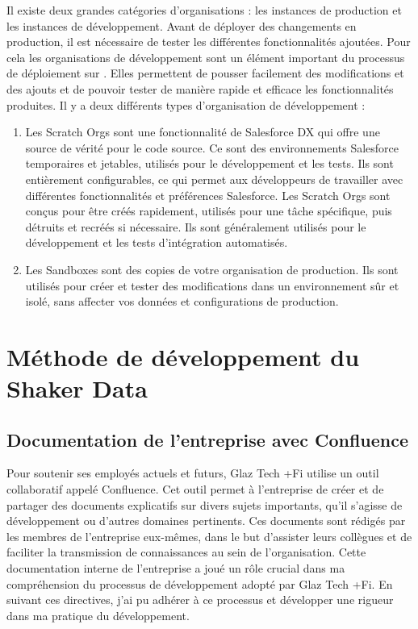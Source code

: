 \documentclass[12pt,oneside,noprintercorrection]{iut}
\begin{document}
Il existe deux grandes catégories d'organisations : les instances de production et les instances de développement.
Avant de déployer des changements en production, il est nécessaire de tester les différentes fonctionnalités ajoutées. Pour cela les organisations de développement sont un élément important du processus de déploiement sur \slf{}. Elles permettent de pousser facilement des modifications et des ajouts et de pouvoir tester de manière rapide et efficace les fonctionnalités produites. Il y a deux différents types d'organisation de développement :
\begin{enumerate}
    \item Les Scratch Orgs sont une fonctionnalité de Salesforce DX qui offre une source de vérité pour le code source. Ce sont des environnements Salesforce temporaires et jetables, utilisés pour le développement et les tests. Ils sont entièrement configurables, ce qui permet aux développeurs de travailler avec différentes fonctionnalités et préférences Salesforce. Les Scratch Orgs sont conçus pour être créés rapidement, utilisés pour une tâche spécifique, puis détruits et recréés si nécessaire. Ils sont généralement utilisés pour le développement et les tests d'intégration automatisés.
    \item Les Sandboxes sont des copies de votre organisation de production. Ils sont utilisés pour créer et tester des modifications dans un environnement sûr et isolé, sans affecter vos données et configurations de production.
\end{enumerate}

\chapter{Méthode de développement du Shaker Data}

\section{Documentation de l'entreprise avec Confluence}
Pour soutenir ses employés actuels et futurs, Glaz Tech +Fi utilise un outil collaboratif appelé Confluence. Cet outil permet à l'entreprise de créer et de partager des documents explicatifs sur divers sujets importants, qu'il s'agisse de développement ou d'autres domaines pertinents. Ces documents sont rédigés par les membres de l'entreprise eux-mêmes, dans le but d'assister leurs collègues et de faciliter la transmission de connaissances au sein de l'organisation.
Cette documentation interne de l'entreprise a joué un rôle crucial dans ma compréhension du processus de développement adopté par Glaz Tech +Fi. En suivant ces directives, j'ai pu adhérer à ce processus et développer une rigueur dans ma pratique du développement.
\end{document}
